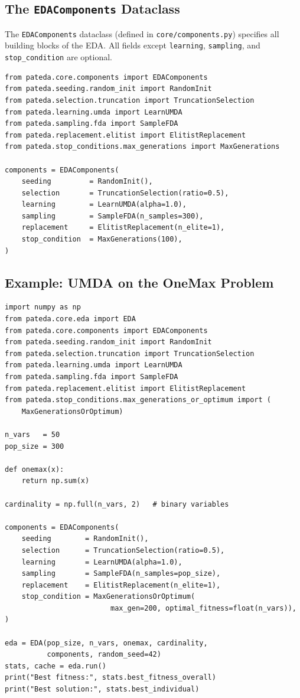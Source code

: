 \documentclass[a4paper,11pt]{article}
\begin{document}
\subsection{The \texttt{EDAComponents} Dataclass}

The \texttt{EDAComponents} dataclass (defined in \texttt{core/components.py})
specifies all building blocks of the EDA.  All fields except
\texttt{learning}, \texttt{sampling}, and \texttt{stop\_condition} are optional.

\begin{lstlisting}
from pateda.core.components import EDAComponents
from pateda.seeding.random_init import RandomInit
from pateda.selection.truncation import TruncationSelection
from pateda.learning.umda import LearnUMDA
from pateda.sampling.fda import SampleFDA
from pateda.replacement.elitist import ElitistReplacement
from pateda.stop_conditions.max_generations import MaxGenerations

components = EDAComponents(
    seeding         = RandomInit(),
    selection       = TruncationSelection(ratio=0.5),
    learning        = LearnUMDA(alpha=1.0),
    sampling        = SampleFDA(n_samples=300),
    replacement     = ElitistReplacement(n_elite=1),
    stop_condition  = MaxGenerations(100),
)
\end{lstlisting}

\subsection{Example: UMDA on the OneMax Problem}
\label{ex:umda_onemax}

\begin{lstlisting}
import numpy as np
from pateda.core.eda import EDA
from pateda.core.components import EDAComponents
from pateda.seeding.random_init import RandomInit
from pateda.selection.truncation import TruncationSelection
from pateda.learning.umda import LearnUMDA
from pateda.sampling.fda import SampleFDA
from pateda.replacement.elitist import ElitistReplacement
from pateda.stop_conditions.max_generations_or_optimum import (
    MaxGenerationsOrOptimum)

n_vars   = 50
pop_size = 300

def onemax(x):
    return np.sum(x)

cardinality = np.full(n_vars, 2)   # binary variables

components = EDAComponents(
    seeding        = RandomInit(),
    selection      = TruncationSelection(ratio=0.5),
    learning       = LearnUMDA(alpha=1.0),
    sampling       = SampleFDA(n_samples=pop_size),
    replacement    = ElitistReplacement(n_elite=1),
    stop_condition = MaxGenerationsOrOptimum(
                         max_gen=200, optimal_fitness=float(n_vars)),
)

eda = EDA(pop_size, n_vars, onemax, cardinality,
          components, random_seed=42)
stats, cache = eda.run()
print("Best fitness:", stats.best_fitness_overall)
print("Best solution:", stats.best_individual)
\end{lstlisting}
\end{document}
